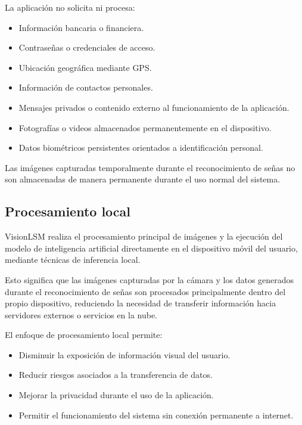 	La aplicación no solicita ni procesa:
	
	\begin{itemize}
		\item Información bancaria o financiera.
		
		\item Contraseñas o credenciales de acceso.
		
		\item Ubicación geográfica mediante GPS.
		
		\item Información de contactos personales.
		
		\item Mensajes privados o contenido externo al funcionamiento de la aplicación.
		
		\item Fotografías o videos almacenados permanentemente en el dispositivo.
		
		\item Datos biométricos persistentes orientados a identificación personal.
	\end{itemize}
	
	Las imágenes capturadas temporalmente durante el reconocimiento de señas no son almacenadas de manera permanente durante el uso normal del sistema.
	
	\subsection{Procesamiento local}
	
	VisionLSM realiza el procesamiento principal de imágenes y la ejecución del modelo de inteligencia artificial directamente en el dispositivo móvil del usuario, mediante técnicas de inferencia local.
	
	Esto significa que las imágenes capturadas por la cámara y los datos generados durante el reconocimiento de señas son procesados principalmente dentro del propio dispositivo, reduciendo la necesidad de transferir información hacia servidores externos o servicios en la nube.
	
	El enfoque de procesamiento local permite:
	
	\begin{itemize}
		\item Disminuir la exposición de información visual del usuario.
		
		\item Reducir riesgos asociados a la transferencia de datos.
		
		\item Mejorar la privacidad durante el uso de la aplicación.
		
		\item Permitir el funcionamiento del sistema sin conexión permanente a internet.
	\end{itemize}
	
